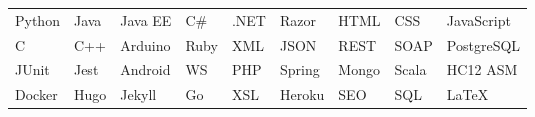 \documentclass[]{rcf_cv}
\begin{document}
	\begin{tabular}{l l l l l l l l l}
		Python & Java & Java EE & C\# & .NET & Razor & HTML & CSS & JavaScript\\
		
		C & C++ & Arduino & Ruby & XML & JSON & REST & SOAP & PostgreSQL\\
		
		JUnit & Jest & Android & WS & PHP & Spring & Mongo & Scala &  HC12 ASM\\
		
		Docker & Hugo & Jekyll & Go & XSL & Heroku & SEO & SQL & \LaTeX
		
	\end{tabular}
	
\end{document}
